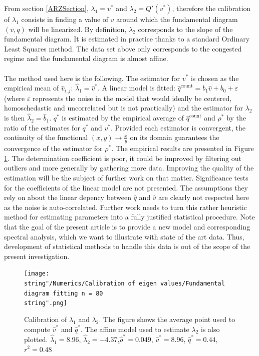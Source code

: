 \documentclass[preprint]{elsarticle}
\begin{document}
From section \ref{ARZSection}, $\lambda_{1}=v^{*}$ and $\lambda_{2}=Q'\left(v^{*}\right)$, therefore
the calibration of $\lambda_{1}$ consists in finding a value of $v$
around which the fundamental diagram $\left(v,q\right)$ will be linearized.
By definition, $\lambda_{2}$ corresponds to the slope of the fundamental
diagram. It is estimated in practice thanks to a standard Ordinary Least
Squares method. The data set above only corresponds to the congested
regime and the fundamental diagram is almost affine.\\
\\
The method used here is the following. The estimator
for $v^{*}$ is chosen as the empirical mean of $\widehat{v}_{i,j}$:
$\widehat{\lambda}_{1}=\widehat{v}^{*}$. A linear model is fitted:
$\widehat{q}^{\text{count}}=b_{1}\widehat{v}+b_{0}+\varepsilon$ (where $\varepsilon$
represents the noise in the model that would ideally be centered,
homoschedastic and uncorrelated but is not practically) and the estimator
for $\lambda_{2}$ is then $\widehat{\lambda}_{2}=\widehat{b}_{1}$.
$q^{*}$ is estimated by the empirical average of $\widehat{q}^{\text{count}}$
and $\rho^{*}$ by the ratio of the estimates for $q^{*}$ and $v^{*}$.
Provided each estimator is convergent, the continuity of the functional
$\left(x,y\right)\rightarrow\frac{x}{y}$ on its domain guarantees
the convergence of the estimator for $\rho^{*}$. The empirical results are presented in Figure \ref{fig:Calibration-of-eigen-values}.
The determination coefficient is poor, it could be improved
by filtering out outliers and more generally by gathering more data.
Improving the quality of the estimation will be the subject of further
work on that matter. Significance tests for the coefficients of the
linear model are not presented. The assumptions they rely on about
the linear depency between $\widehat{q}$ and $\widehat{v}$ are clearly
not respected here as the noise is auto-correlated. Further
work needs to turn this rather heuristic method for estimating parameters
into a fully justified statistical procedure. Note that the goal of the present article is to provide a new model and corresponding spectral analysis, which we want to illustrate with state of the art data. Thus, development of statistical methods to handle this data is out of the scope of the present investigation.

\begin{figure}[H]
\centering
\texttt{[image: \\string"/Numerics/Calibration of eigen values/Fundamental diagram fitting n = 80\\string".png]}
\protect\caption{Calibration of $\lambda_{1}$ and $\lambda_{2}$. The figure shows
the average point used to compute $\widehat{v}^{*}$ and $\widehat{q}^{*}$.
The affine model used to estimate $\lambda_{2}$ is also plotted. $\widehat{\lambda}_{1}=8.96$, $\widehat{\lambda}_{2}=-4.37$,$\widehat{\rho}^{*}=0.049$, $\widehat{v}^{*}=8.96$, $\widehat{q}^{*}=0.44$, $r^{2}=0.48$}
\label{fig:Calibration-of-eigen-values}
\end{figure}
\end{document}
